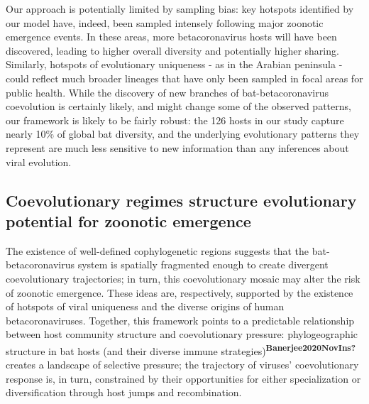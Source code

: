 \documentclass[10pt,oneside]{article}
\begin{document}
Our approach is potentially limited by sampling bias: key hotspots
identified by our model have, indeed, been sampled intensely following
major zoonotic emergence events. In these areas, more betacoronavirus
hosts will have been discovered, leading to higher overall diversity and
potentially higher sharing. Similarly, hotspots of evolutionary
uniqueness - as in the Arabian peninsula - could reflect much broader
lineages that have only been sampled in focal areas for public health.
While the discovery of new branches of bat-betacoronavirus coevolution
is certainly likely, and might change some of the observed patterns, our
framework is likely to be fairly robust: the 126 hosts in our study
capture nearly 10\% of global bat diversity, and the underlying
evolutionary patterns they represent are much less sensitive to new
information than any inferences about viral evolution.

\hypertarget{coevolutionary-regimes-structure-evolutionary-potential-for-zoonotic-emergence}{%
\subsection{Coevolutionary regimes structure evolutionary potential for
zoonotic
emergence}\label{coevolutionary-regimes-structure-evolutionary-potential-for-zoonotic-emergence}}

The existence of well-defined cophylogenetic regions suggests that the
bat-betacoronavirus system is spatially fragmented enough to create
divergent coevolutionary trajectories; in turn, this coevolutionary
mosaic may alter the risk of zoonotic emergence. These ideas are,
respectively, supported by the existence of hotspots of viral uniqueness
and the diverse origins of human betacoronaviruses. Together, this
framework points to a predictable relationship between host community
structure and coevolutionary pressure: phylogeographic structure in bat
hosts (and their diverse immune
strategies)\textsuperscript{\textbf{Banerjee2020NovIns?}} creates a
landscape of selective pressure; the trajectory of viruses'
coevolutionary response is, in turn, constrained by their opportunities
for either specialization or diversification through host jumps and
recombination.
\end{document}
